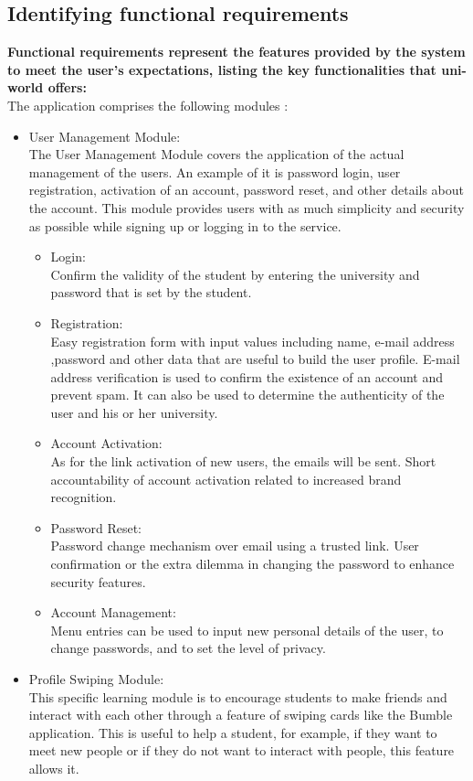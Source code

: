 \subsection{Identifying functional requirements}
\textbf{Functional requirements represent the features provided by the system to meet the user's expectations, listing the key functionalities that uni-world offers:}\\
The application comprises the following modules : 
\begin{itemize}
    \item User Management Module:\\
The User Management Module covers the application of the actual management of the users. An example of it is password login, user registration, activation of an account, password reset, and other details about the account. This module provides users with as much simplicity and security as possible while signing up or logging in to the service.
\begin{itemize}
\item Login: \\
Confirm the validity of the student by entering the university and password that is set by the student.
\item Registration: \\
Easy registration form with input values including name, e-mail address ,password and other data that are useful to build the user profile.
E-mail address verification is used to confirm the existence of an account and prevent spam. It can also be used to determine the authenticity of the user and his or her university.
\item Account Activation:\\
As for the link activation of new users, the emails will be sent.
Short accountability of account activation related to increased brand recognition.
\item Password Reset:\\
Password change mechanism over email using a trusted link.
User confirmation or the extra dilemma in changing the password to enhance security features.
\item Account Management:\\
Menu entries can be used to input new personal details of the user, to change passwords, and to set the level of privacy.
\end{itemize}    
    \item Profile Swiping Module:\\
This specific learning module is to encourage students to make friends and interact with each other through a feature of swiping cards like the Bumble application. This is useful to help a student, for example, if they want to meet new people or if they do not want to interact with people, this feature allows it.

\end{itemize}
